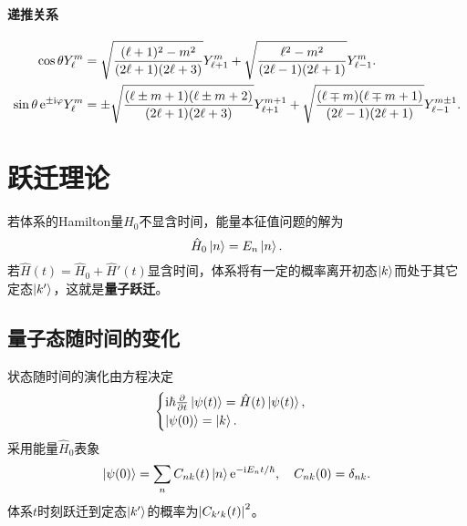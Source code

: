 \paragraph*{递推关系}
{\small\begin{align}\label{costhetaYlm}
	\cos\theta Y_\ell^m&=\sqrt{\frac{(\ell+1)^2-m^2}{(2\ell+1)(2\ell+3)}}Y_{\ell+1}^m+\sqrt{\frac{\ell^2-m^2}{(2\ell-1)(2\ell+1)}}Y_{\ell-1}^m.\\
	\sin\theta\mathop{}\!\mathrm{e}^{\pm\mathrm{i}\varphi}Y_\ell^m&=\pm\sqrt{\frac{(\ell\pm m+1)(\ell\pm m+2)}{(2\ell+1)(2\ell+3)}}Y_{\ell+1}^{m+1}+\sqrt{\frac{(\ell\mp m)(\ell\mp m+1)}{(2\ell-1)(2\ell+1)}}Y_{\ell-1}^{m\pm 1}.
\end{align}}
\clearpage
\section{跃迁理论}
若体系的Hamilton量$\hat H_0$不显含时间，能量本征值问题的解为
\[
	\hat H_0\left\vert n\right\rangle=E_n\left\vert n\right\rangle.
\]
若$\hat H(t)=\hat H_0+\hat H'(t)$显含时间，体系将有一定的概率离开初态$\left\vert k\right\rangle$而处于其它定态$\left\vert k'\right\rangle$，这就是\textbf{量子跃迁}。
\subsection{量子态随时间的变化}
状态随时间的演化由\Schr 方程决定
\begin{align}
	\begin{cases}
		\mathrm{i}\hbar\frac{\partial^{\;\!\!}}{\partial t^{\;\!\!}}\left\vert \psi(t)\right\rangle=\hat H(t)\left\vert \psi(t)\right\rangle,\\
		\left\vert \psi(0)\right\rangle=\left\vert k\right\rangle.
	\end{cases}
\end{align}
采用能量$\hat H_0$表象 
\begin{align}
	\left\vert \psi(0)\right\rangle=\sum_n C_{nk}(t)\left\vert n\right\rangle\mathop{}\!\mathrm{e}^{-\mathrm{i} E_nt/\hbar},\quad C_{nk}(0)=\mathop{}\!\delta_{nk}.
\end{align}
体系$t$时刻跃迁到定态$\left\vert k'\right\rangle$的概率为$\left\lvert C_{k'k}(t)\right\rvert^2$。

